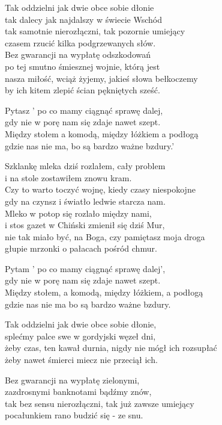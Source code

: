 \begin{text}
    \small{
    Tak oddzielni jak dwie obce sobie dłonie\\
    tak dalecy jak najdalszy w świecie Wschód\\
    tak samotnie nierozłączni, tak pozornie umiejący\\
    czasem rzucić kilka podgrzewanych słów.\\
    Bez gwarancji na wypłatę odszkodowań\\
    po tej smutno śmiesznej wojnie, którą jest\\
    nasza miłość, wciąż żyjemy, jakieś słowa bełkoczemy\\
    by ich kitem zlepić ścian pękniętych sześć.

    Pytasz ' po co mamy ciągnąć sprawę dalej,\\
    gdy nie w porę nam się zdaje nawet szept.\\
    Między stołem a komodą, między łóżkiem a podłogą\\
    gdzie nas nie ma, bo są bardzo ważne bzdury.'

    Szklankę mleka dziś rozlałem, cały problem\\
    i na stole zostawiłem znowu kram.\\
    Czy to warto toczyć wojnę, kiedy czasy niespokojne\\
    gdy na czynsz i światło ledwie starcza nam.\\
    Mleko w potop się rozlało między nami,\\
    i stos gazet w Chiński zmienił się dziś Mur,\\
    nie tak miało być, na Boga, czy pamiętasz moja droga\\
    głupie mrzonki o pałacach pośród chmur.

    Pytam ' po co mamy ciągnąć sprawę dalej',\\
    gdy nie w porę nam się zdaje nawet szept.\\
    Między stołem, a komodą, między łóżkiem, a podłogą\\
    gdzie nas nie ma bo są bardzo ważne bzdury.

    Tak oddzielni jak dwie obce sobie dłonie,\\
    splećmy palce swe w gordyjski węzeł dni,\\
    żeby czas, ten kawał durnia, nigdy nie mógł ich rozsupłać\\
    żeby nawet śmierci miecz nie przeciął ich.

    Bez gwarancji na wypłatę zielonymi,\\
    zazdrosnymi banknotami bądźmy znów,\\
    tak bez sensu nierozłączni, tak już zawsze umiejący\\
    pocałunkiem rano budzić się - ze snu.
    }
\end{text}
